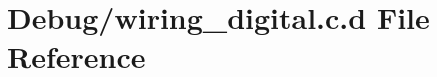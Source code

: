 \hypertarget{_debug_2wiring__digital_8c_8d}{\section{\-Debug/wiring\-\_\-digital.c.\-d \-File \-Reference}
\label{_debug_2wiring__digital_8c_8d}
}
